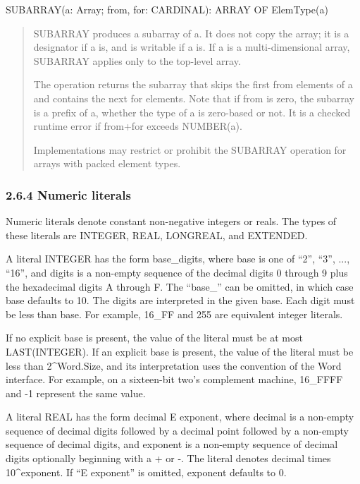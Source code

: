\documentclass[10pt]{article}
\begin{document}
  SUBARRAY(a: Array; from, for: CARDINAL): ARRAY OF ElemType(a) 
\begin{quote}
SUBARRAY produces a subarray of a. It does not copy the array; it is a designator if a is, and is writable if a is. If a is a multi-dimensional array, SUBARRAY applies only to the top-level array. 

 The operation returns the subarray that skips the first from elements of a and contains the next for elements. Note that if from is zero, the subarray is a prefix of a, whether the type of a is zero-based or not. It is a checked runtime error if from+for exceeds NUMBER(a). 


 Implementations may restrict or prohibit the SUBARRAY operation for arrays with packed element types. 
\end{quote}



 
\subsubsection*{2.6.4 Numeric literals}


  Numeric literals denote constant non-negative integers or reals. The types of these literals are INTEGER, REAL, LONGREAL, and EXTENDED. 


  A literal INTEGER has the form base\_digits, where base is one of ``2'', ``3'', ..., ``16'', and digits is a non-empty sequence of the decimal digits 0 through 9 plus the hexadecimal digits A through F. The ``base\_'' can be omitted, in which case base defaults to 10. The digits are interpreted in the given base. Each digit must be less than base. For example, 16\_FF and 255 are equivalent integer literals. 


  If no explicit base is present, the value of the literal must be at most LAST(INTEGER). If an explicit base is present, the value of the literal must be less than 2\^{}Word.Size, and its interpretation uses the convention of the Word interface. For example, on a sixteen-bit two's complement machine, 16\_FFFF and -1 represent the same value. 


 A literal REAL has the form decimal E exponent, where decimal is a non-empty sequence of decimal digits followed by a decimal point followed by a non-empty sequence of decimal digits, and exponent is a non-empty sequence of decimal digits optionally beginning with a + or -. The literal denotes decimal times 10\^{}exponent. If ``E exponent'' is omitted, exponent defaults to 0. 
\end{document}
